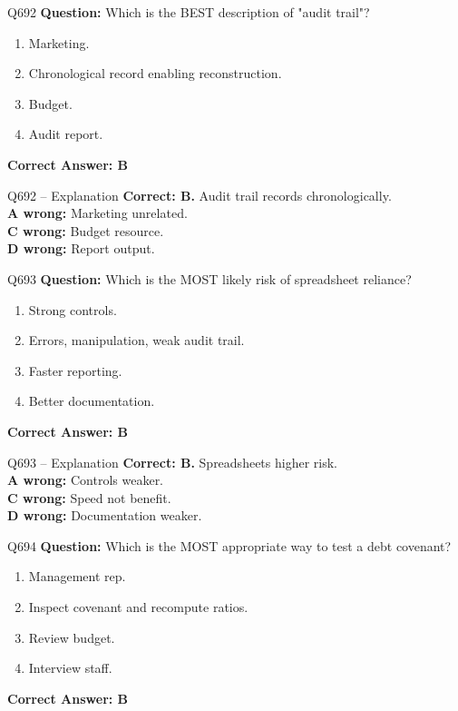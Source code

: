 \documentclass[aspectratio=169,10pt]{beamer}
\begin{document}
	\begin{frame}[t]{Q692}
		\small
		\textbf{Question:} Which is the BEST description of "audit trail"?
		\begin{enumerate}[label=\Alph*.,itemsep=1pt,topsep=2pt]
			\item Marketing.
			\item Chronological record enabling reconstruction.
			\item Budget.
			\item Audit report.
		\end{enumerate}
		\vspace{4pt}
		\textbf{Correct Answer: B}
	\end{frame}
	
	\begin{frame}[t]{Q692 -- Explanation}
		\small
		\textbf{Correct: B.} Audit trail records chronologically. \\[4pt]
		\textbf{A wrong:} Marketing unrelated. \\[2pt]
		\textbf{C wrong:} Budget resource. \\[2pt]
		\textbf{D wrong:} Report output.
	\end{frame}
	
	\begin{frame}[t]{Q693}
		\small
		\textbf{Question:} Which is the MOST likely risk of spreadsheet reliance?
		\begin{enumerate}[label=\Alph*.,itemsep=1pt,topsep=2pt]
			\item Strong controls.
			\item Errors, manipulation, weak audit trail.
			\item Faster reporting.
			\item Better documentation.
		\end{enumerate}
		\vspace{4pt}
		\textbf{Correct Answer: B}
	\end{frame}
	
	\begin{frame}[t]{Q693 -- Explanation}
		\small
		\textbf{Correct: B.} Spreadsheets higher risk. \\[4pt]
		\textbf{A wrong:} Controls weaker. \\[2pt]
		\textbf{C wrong:} Speed not benefit. \\[2pt]
		\textbf{D wrong:} Documentation weaker.
	\end{frame}
	
	\begin{frame}[t]{Q694}
		\small
		\textbf{Question:} Which is the MOST appropriate way to test a debt covenant?
		\begin{enumerate}[label=\Alph*.,itemsep=1pt,topsep=2pt]
			\item Management rep.
			\item Inspect covenant and recompute ratios.
			\item Review budget.
			\item Interview staff.
		\end{enumerate}
		\vspace{4pt}
		\textbf{Correct Answer: B}
	\end{frame}
	
\end{document}
